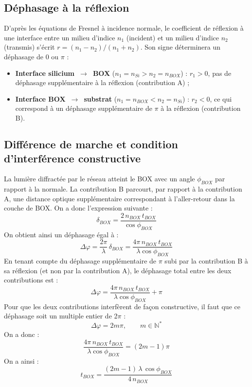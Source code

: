 \documentclass[a4paper,11pt]{report}
\begin{document}
\subsection*{Déphasage à la réflexion}

D'après les équations de Fresnel à incidence normale, le coefficient de réflexion à une interface entre un milieu d'indice $n_1$ (incident) et un milieu d'indice $n_2$ (transmis) s'écrit $r=(n_1-n_2)/(n_1+n_2)$. Son signe déterminera un déphasage de $0$ ou $\pi$ :

\begin{itemize}
    \item \textbf{Interface silicium~$\rightarrow$~BOX} ($n_1=n_{Si}>n_2=n_{BOX}$) : $r_1>0$, pas de déphasage supplémentaire à la réflexion (contribution A) ;
    \item \textbf{Interface BOX~$\rightarrow$~substrat} ($n_1=n_{BOX}<n_2=n_{Si}$) : $r_2<0$, ce qui correspond à un déphasage supplémentaire de $\pi$ à la réflexion (contribution B).
\end{itemize}

\subsection*{Différence de marche et condition d'interférence constructive}

La lumière diffractée par le réseau atteint le BOX avec un angle $\phi_{BOX}$ par rapport à la normale. La contribution B parcourt, par rapport à la contribution A, une distance optique supplémentaire correspondant à l'aller-retour dans la couche de BOX. On a donc l'expression suivante :
\begin{equation}
\delta_{BOX} = \frac{2\,n_{BOX}\,t_{BOX}}{\cos\phi_{BOX}}
\end{equation}
On obtient ainsi un déphasage égal à :
\begin{equation}
\Delta\varphi = \dfrac{2\pi}{\lambda}\,\delta_{BOX} = \dfrac{4\pi\,n_{BOX}\,t_{BOX}}{\lambda\cos\phi_{BOX}}
\end{equation}
En tenant compte du déphasage supplémentaire de $\pi$ subi par la contribution B à sa réflexion (et non par la contribution A), le déphasage total entre les deux contributions est :
\begin{equation}
\Delta\varphi = \frac{4\pi\,n_{BOX}\,t_{BOX}}{\lambda\cos\phi_{BOX}} + \pi
\end{equation}
Pour que les deux contributions interfèrent de façon constructive, il faut que ce déphasage soit un multiple entier de 2$\pi$ :
\begin{equation}
\Delta\varphi = 2m\pi, \qquad m\in\mathbb{N}^*
\end{equation}
On a donc :
\begin{equation}
\frac{4\pi\,n_{BOX}\,t_{BOX}}{\lambda\cos\phi_{BOX}} = (2m-1)\pi
\end{equation}
On a ainsi :
\begin{equation}
\boxed{t_{BOX} = \frac{(2m-1)\,\lambda\,\cos\phi_{BOX}}{4\,n_{BOX}}}
\label{eq:box_quarter_wave}
\end{equation}
\end{document}
